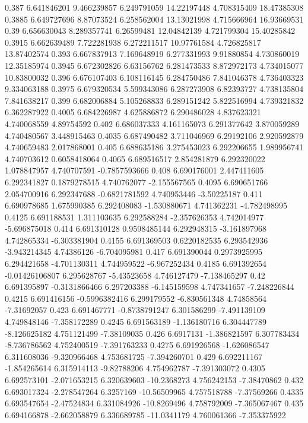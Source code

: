 {0.387 6.641846201 9.466239857 6.249791059 14.22197448 4.708315409 18.47385308
0.3885 6.649727696 8.87073524 6.258562004 13.13021998 4.715666964 16.93669531
0.39 6.656630043 8.289357741 6.26599481 12.04842139 4.721799304 15.40285842
0.3915 6.662639489 7.722281938 6.272211517 10.97761584 4.726825817 13.87402574
0.393 6.667837913 7.169648919 6.277331993 9.91880854 4.730860019 12.35185974
0.3945 6.672302826 6.63156762 6.281473533 8.872972173 4.734015077 10.83800032
0.396 6.676107403 6.108116145 6.284750486 7.841046378 4.736403323 9.334063188
0.3975 6.679320534 5.599343086 6.287273908 6.82393727 4.738135804 7.841638217
0.399 6.682006884 5.105268833 6.289151242 5.822516994 4.739321832 6.362287922
0.4005 6.684226987 4.625886872 6.290486028 4.837623321 4.740068559 4.89754592
0.402 6.686037333 4.161165073 6.291377642 3.870059289 4.740480567 3.448915463
0.4035 6.687490482 3.711046969 6.29192106 2.920592879 4.740659483 2.017868001
0.405 6.688635186 3.275453023 6.292206655 1.989956741 4.740703612 0.6058418064
0.4065 6.689516517 2.854281879 6.292320022 1.078847957 4.740707591 -0.7857593666
0.408 6.690176001 2.447411605 6.292341827 0.1879278515 4.740762077 -2.155567565
0.4095 6.690651766 2.054700916 6.292347688 -0.6821781592 4.740953446 -3.50225187
0.411 6.690978685 1.675990385 6.292408083 -1.530880671 4.741362231 -4.782498995
0.4125 6.691188531 1.311103635 6.292588284 -2.357626353 4.742014977 -5.696875018
0.414 6.691310128 0.9598485144 6.292948315 -3.161897968 4.742865334 -6.303381904
0.4155 6.691369503 0.6220182535 6.293542936 -3.943214345 4.74386126 -6.704095981
0.417 6.691390044 0.2973925995 6.294421658 -4.701130311 4.744959522 -6.967252434
0.4185 6.691392654 -0.01426106807 6.295628767 -5.43523658 4.746127479 -7.138465297
0.42 6.691395897 -0.3131866466 6.297203388 -6.145159598 4.747341657 -7.248226844
0.4215 6.691416156 -0.5996382416 6.299179552 -6.830561348 4.74858564 -7.31692057
0.423 6.691467771 -0.8738791247 6.301586299 -7.491139109 4.749848146 -7.358172289
0.4245 6.691563189 -1.136180716 6.304447789 -8.126625182 4.751121499 -7.38109035
0.426 6.6917131 -1.386821597 6.307783434 -8.736786562 4.752400519 -7.391763233
0.4275 6.691926568 -1.626086547 6.311608036 -9.320966468 4.753681725 -7.394260701
0.429 6.692211167 -1.854265614 6.315914113 -9.82788206 4.754962787 -7.391303072
0.4305 6.692573101 -2.071653215 6.320639603 -10.2368273 4.756242153 -7.38470862
0.432 6.693017324 -2.278547264 6.3257169 -10.56509965 4.757518788 -7.37569266
0.4335 6.693547654 -2.47524834 6.331084926 -10.8269496 4.758792009 -7.365067467
0.435 6.694166878 -2.662058879 6.336689785 -11.0341179 4.760061366 -7.353375922
}
